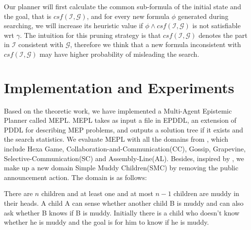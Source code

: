 \documentclass{llncs}
\begin{document}
      Our planner will first calculate the common sub-formula of the initial state and the goal, that is $csf(\mathcal{I}, \mathcal{G})$, and for every new formula $\phi$ generated during searching, we will increase its heuristic value if $\phi\land csf(\mathcal{I}, \mathcal{G})$ is not satisfiable wrt $\gamma$. The intuition for this pruning strategy is that $csf(\mathcal{I}, \mathcal{G})$ denotes the part in $\mathcal{I}$ consistent with $\mathcal{G}$, therefore we think that a new formula inconsistent with $csf(\mathcal{I}, \mathcal{G})$ may have higher probability of misleading the search.

\section{Implementation and Experiments}
Based on the theoretic work, we have implemented a Multi-Agent Epistemic Planner called MEPL. MEPL takes as input a file in EPDDL, an extension of PDDL \cite{mcdermott1998pddl} for describing MEP problems, and outputs a solution tree if it exists and the search statistics. We evaluate MEPL with all the domains from \cite{Liu2017A}, which include Hexa Game, Collaboration-and-Communication(CC), Gossip, Grapevine, Selective-Communication(SC) and Assembly-Line(AL). Besides, inspired by \cite{kominis2015beliefs}, we make up a new domain Simple Muddy Children(SMC) by removing the public announcement action. The domain is as follows:

There are $n$ children and at least one and at most $n-1$ children are muddy in their heads. A child A can sense whether another child B is muddy and can also ask whether B knows if B is muddy. Initially there is a child who doesn't know whether he is muddy and the goal is for him to know if he is muddy.
\end{document}
